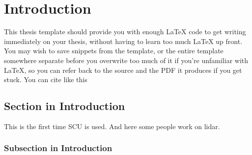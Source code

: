 
\def\chapdir{./ChapterIntro}

\chapter{Introduction} \label{ch:intro}

This thesis template should provide you with enough \LaTeX{} code to get writing immediately on your thesis, without having to learn too much \LaTeX{} up front. You may wish to save snippets from the template, or the entire template somewhere separate before you overwrite too much of it if you're unfamiliar with \LaTeX{}, so you can refer back to the source and the PDF it produces if you get stuck. You can cite like this \cite{Douillard2009}

\lipsum[1-3]
\section{Section in Introduction}
This is the first time \ac{SCU} is used. And here some people work on \ac{lidar}. \lipsum[4-7]
\subsection{Subsection in Introduction}
\lipsum[7-11]





